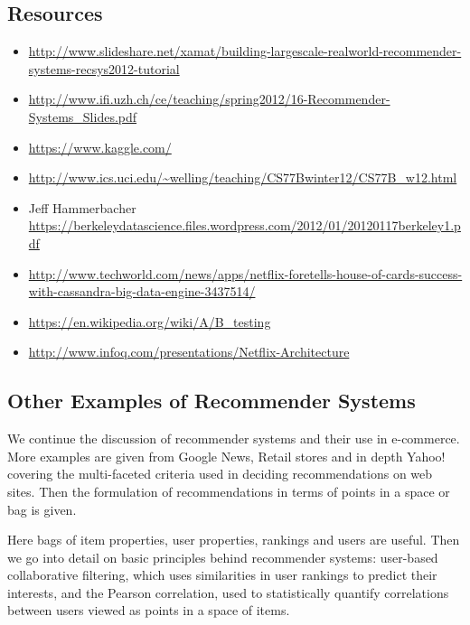 

\subsection{Resources}

\begin{itemize}

\item
  \url{http://www.slideshare.net/xamat/building-largescale-realworld-recommender-systems-recsys2012-tutorial}
\item
  \url{http://www.ifi.uzh.ch/ce/teaching/spring2012/16-Recommender-Systems_Slides.pdf}
\item
  \url{https://www.kaggle.com/}
\item
  \url{http://www.ics.uci.edu/~welling/teaching/CS77Bwinter12/CS77B_w12.html}
\item
  Jeff Hammerbacher
  \url{https://berkeleydatascience.files.wordpress.com/2012/01/20120117berkeley1.pdf}
\item
  \url{http://www.techworld.com/news/apps/netflix-foretells-house-of-cards-success-with-cassandra-big-data-engine-3437514/}
\item
  \url{https://en.wikipedia.org/wiki/A/B_testing}
\item
  \url{http://www.infoq.com/presentations/Netflix-Architecture}
\end{itemize}

\subsection{Other Examples of Recommender Systems}

We continue the discussion of recommender systems and their use in
e-commerce. More examples are given from Google News, Retail stores and
in depth Yahoo! covering the multi-faceted criteria used in deciding
recommendations on web sites. Then the formulation of recommendations in
terms of points in a space or bag is given.

Here bags of item properties, user properties, rankings and users are
useful. Then we go into detail on basic principles behind recommender
systems: user-based collaborative filtering, which uses similarities in
user rankings to predict their interests, and the Pearson correlation,
used to statistically quantify correlations between users viewed as
points in a space of items.

